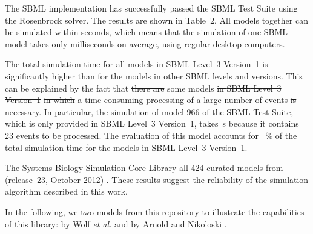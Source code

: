 \documentclass[10pt]{bmc_article}
\newenvironment{bmcformat}{\fussy\setboolean{publ}{true}}{\fussy}
\begin{document}
\begin{bmcformat}
The  \acs{SBML} implementation has successfully passed the
SBML Test Suite  using the Rosenbrock solver.
The results are shown in Table~2.
All models together can be simulated within seconds, which means that the
simulation of one \acs{SBML} model takes only milliseconds on average, using
regular desktop computers.

The total simulation time for all models in \acs{SBML} Level~3 Version~1 is
significantly higher than for the models in other \acs{SBML} levels and
versions.
This can be explained by the fact that \sout{there are} some models
\sout{in \acs{SBML} Level~3 Version~1} 
\sout{in which} 
a time-consuming processing of a large number of events\sout{ is necessary}.
In particular, the simulation of model \COR{\numero~}966 of the SBML Test Suite,
which is only provided in \acs{SBML} Level~3 Version~1, takes \,s 
because it contains 23 events to be processed.
The evaluation of this model accounts for ~\% of the total
simulation time for the models in \acs{SBML} Level~3 Version~1.

The Systems Biology Simulation Core Library 
all 424 curated models from 
(release~23, October 2012) .
These results suggest the reliability of the simulation algorithm described in
this work.

In the following, we  two models 
from this repository to illustrate the capabilities of this library:
 by Wolf \emph{et al.} \cite{Wolf2000}
and  by Arnold 
and Nikoloski \cite{Arnold2011}.


\end{bmcformat}
\end{document}
